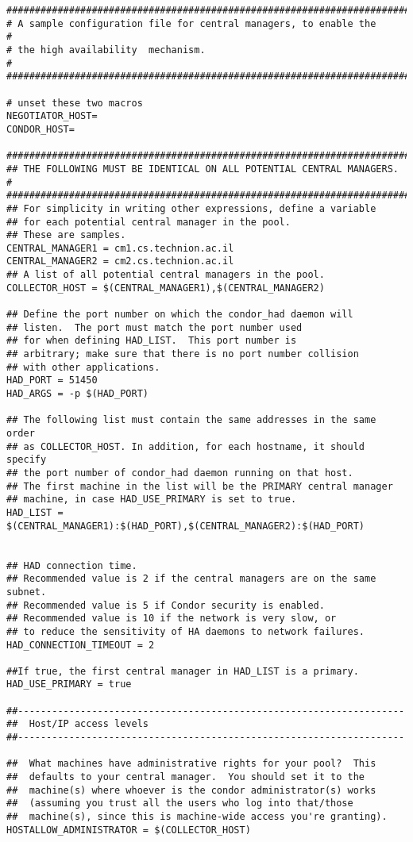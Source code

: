 \footnotesize
\begin{verbatim}
##########################################################################
# A sample configuration file for central managers, to enable the        #
# the high availability  mechanism.                                      #
##########################################################################

# unset these two macros 
NEGOTIATOR_HOST=
CONDOR_HOST=

#########################################################################
## THE FOLLOWING MUST BE IDENTICAL ON ALL POTENTIAL CENTRAL MANAGERS.   # 
#########################################################################
## For simplicity in writing other expressions, define a variable
## for each potential central manager in the pool. 
## These are samples.
CENTRAL_MANAGER1 = cm1.cs.technion.ac.il
CENTRAL_MANAGER2 = cm2.cs.technion.ac.il
## A list of all potential central managers in the pool.
COLLECTOR_HOST = $(CENTRAL_MANAGER1),$(CENTRAL_MANAGER2)

## Define the port number on which the condor_had daemon will
## listen.  The port must match the port number used
## for when defining HAD_LIST.  This port number is
## arbitrary; make sure that there is no port number collision
## with other applications.
HAD_PORT = 51450
HAD_ARGS = -p $(HAD_PORT)

## The following list must contain the same addresses in the same order 
## as COLLECTOR_HOST. In addition, for each hostname, it should specify 
## the port number of condor_had daemon running on that host.
## The first machine in the list will be the PRIMARY central manager
## machine, in case HAD_USE_PRIMARY is set to true.
HAD_LIST = $(CENTRAL_MANAGER1):$(HAD_PORT),$(CENTRAL_MANAGER2):$(HAD_PORT)


## HAD connection time.
## Recommended value is 2 if the central managers are on the same subnet.
## Recommended value is 5 if Condor security is enabled.
## Recommended value is 10 if the network is very slow, or
## to reduce the sensitivity of HA daemons to network failures.
HAD_CONNECTION_TIMEOUT = 2

##If true, the first central manager in HAD_LIST is a primary.
HAD_USE_PRIMARY = true

##--------------------------------------------------------------------
##  Host/IP access levels
##--------------------------------------------------------------------

##  What machines have administrative rights for your pool?  This
##  defaults to your central manager.  You should set it to the
##  machine(s) where whoever is the condor administrator(s) works
##  (assuming you trust all the users who log into that/those
##  machine(s), since this is machine-wide access you're granting).
HOSTALLOW_ADMINISTRATOR = $(COLLECTOR_HOST) 



\end{verbatim}
